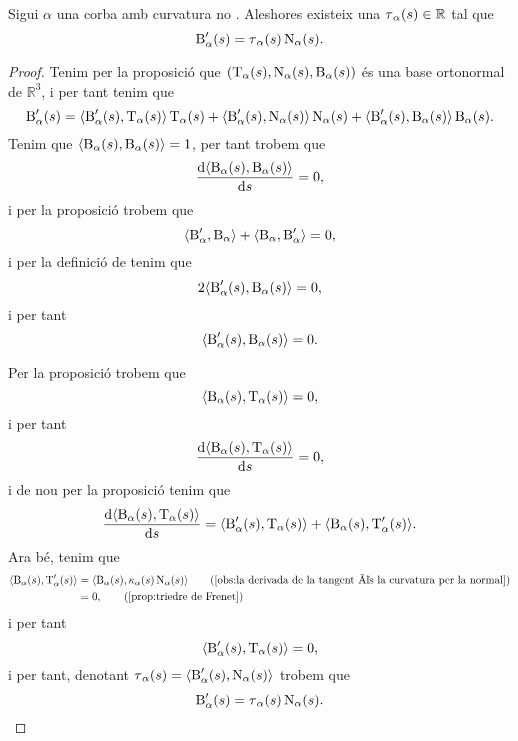 \documentclass[../../Main.tex]{subfiles}
\begin{document}
	\begin{proposition}
		\label{prop:torsió}
		Sigui \(\alpha\) una corba amb curvatura no \nulla{}. Aleshores existeix una \(\operatorname{\tau}_{\alpha}(s)\in\mathbb{R}\) tal que
		\[
		    \operatorname{B}'_{\alpha}(s)=\operatorname{\tau}_{\alpha}(s)\operatorname{N}_{\alpha}(s).
		\]
		\begin{proof}
			Tenim per la proposició  que \((\operatorname{T}_{\alpha}(s),\operatorname{N}_{\alpha}(s),\operatorname{B}_{\alpha}(s))\) és una base ortonormal de \(\mathbb{R}^{3}\), i per tant tenim que %
			\[
			    \binormal'_{\alpha}(s)=\prodesc{\binormal'_{\alpha}(s)}{\tangent_{\alpha}(s)}\tangent_{\alpha}(s)+\prodesc{\binormal'_{\alpha}(s)}{\normal_{\alpha}(s)}\normal_{\alpha}(s)+\prodesc{\binormal'_{\alpha}(s)}{\binormal_{\alpha}(s)}\binormal_{\alpha}(s).
			\]
			Tenim que \(\prodesc{\binormal_{\alpha}(s)}{\binormal_{\alpha}(s)}=1\), per tant trobem que
			\[
			    \frac{\diff\prodesc{\binormal_{\alpha}(s)}{\binormal_{\alpha}(s)}}{\diff s}=0,
			\]
			i per la proposició  trobem que
			\[
			    \prodesc{\binormal'_{\alpha}}{\binormal_{\alpha}}+\prodesc{\binormal_{\alpha}}{\binormal'_{\alpha}}=0,
			\]
			i per la definició de  tenim que
			\[
			    2\prodesc{\binormal'_{\alpha}(s)}{\binormal_{\alpha}(s)}=0,
			\]
			i per tant
			\[
			    \prodesc{\binormal'_{\alpha}(s)}{\binormal_{\alpha}(s)}=0.
			\]
			
			Per la proposició  trobem que
			\[
			    \prodesc{\binormal_{\alpha}(s)}{\tangent_{\alpha}(s)}=0,
			\]
			i per tant
			\[
			    \frac{\diff\prodesc{\binormal_{\alpha}(s)}{\tangent_{\alpha}(s)}}{\diff s}=0,
			\]
			i de nou per la proposició  tenim que
			\[
			    \frac{\diff\prodesc{\binormal_{\alpha}(s)}{\tangent_{\alpha}(s)}}{\diff s}=\prodesc{\binormal'_{\alpha}(s)}{\tangent_{\alpha}(s)}+\prodesc{\binormal_{\alpha}(s)}{\tangent'_{\alpha}(s)}.
			\]
			Ara bé, tenim que
			\begin{align*}
				\prodesc{\binormal_{\alpha}(s)}{\tangent'_{\alpha}(s)}&=\prodesc{\binormal_{\alpha}(s)}{\curvatura_{\alpha}(s)\normal_{\alpha}(s)} \tag{\ref{obs:la derivada de la tangent és la curvatura per la normal}} \\
				&=0, \tag{\ref{prop:triedre de Frenet}}
			\end{align*}
			i per tant
			\[
			    \prodesc{\binormal'_{\alpha}(s)}{\tangent_{\alpha}(s)}=0,
			\]
			i per tant, denotant \(\torsio_{\alpha}(s)=\prodesc{\binormal'_{\alpha}(s)}{\normal_{\alpha}(s)}\) trobem que
			\[
			    \operatorname{B}'_{\alpha}(s)=\operatorname{\tau}_{\alpha}(s)\operatorname{N}_{\alpha}(s).\qedhere
			\]
		\end{proof}
	\end{proposition}
\end{document}
